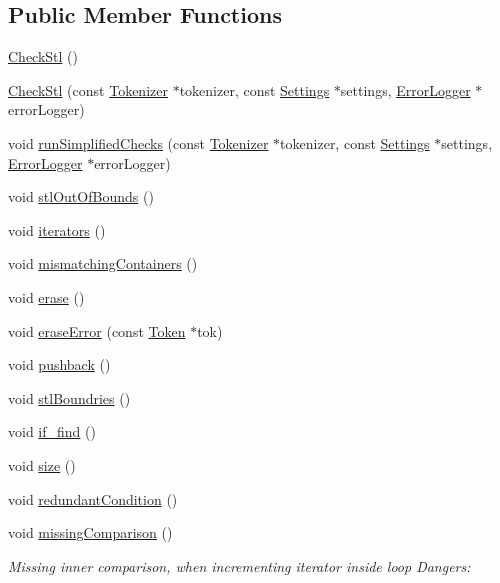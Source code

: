 \subsection*{Public Member Functions}
\begin{DoxyCompactItemize}
\item 
\hyperlink{class_check_stl_a065b77e2f5c0336f6bc784378782551d}{Check\-Stl} ()
\item 
\hyperlink{class_check_stl_a6dbba462c05bf5de06db94ba6408c2ee}{Check\-Stl} (const \hyperlink{class_tokenizer}{Tokenizer} $\ast$tokenizer, const \hyperlink{class_settings}{Settings} $\ast$settings, \hyperlink{class_error_logger}{Error\-Logger} $\ast$error\-Logger)
\item 
void \hyperlink{class_check_stl_a8a27e1c983d1615d224819c87bc1fadb}{run\-Simplified\-Checks} (const \hyperlink{class_tokenizer}{Tokenizer} $\ast$tokenizer, const \hyperlink{class_settings}{Settings} $\ast$settings, \hyperlink{class_error_logger}{Error\-Logger} $\ast$error\-Logger)
\item 
void \hyperlink{class_check_stl_a545ad4f0a38dba2bf8b1a6c48361f200}{stl\-Out\-Of\-Bounds} ()
\item 
void \hyperlink{class_check_stl_a8fb8b983714fee24ff14ac85ae5413c0}{iterators} ()
\item 
void \hyperlink{class_check_stl_a9edc5084d5d02131f9e0cc207e967f90}{mismatching\-Containers} ()
\item 
void \hyperlink{class_check_stl_a0950780cbd021c061e1c4bf45714edd4}{erase} ()
\item 
void \hyperlink{class_check_stl_ad5eaf234908520b84716512ea06ce13c}{erase\-Error} (const \hyperlink{class_token}{Token} $\ast$tok)
\item 
void \hyperlink{class_check_stl_a2abe071c77f90bb2c4de804480fae3a2}{pushback} ()
\item 
void \hyperlink{class_check_stl_a99214e13d8b25c2422d94e680c029639}{stl\-Boundries} ()
\item 
void \hyperlink{class_check_stl_a7f9b0180409369f45eaf701c64e7474e}{if\-\_\-find} ()
\item 
void \hyperlink{class_check_stl_a2fec71741636970fc79b997a0a1a4c83}{size} ()
\item 
void \hyperlink{class_check_stl_abe03476dc6368ba6c20ad90d7eb967a8}{redundant\-Condition} ()
\item 
void \hyperlink{class_check_stl_a0715e9b1395c5a8d6591ed238805eb7a}{missing\-Comparison} ()
\begin{DoxyCompactList}\small\item\em Missing inner comparison, when incrementing iterator inside loop Dangers\-: \end{DoxyCompactList}\item 

\end{DoxyCompactItemize}
